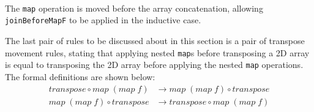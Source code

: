 \documentclass{l4proj}
\begin{document}
\begin{code}
%
\>[2]\AgdaSpace{}%
\AgdaSpace{}%
\AgdaSpace{}%
\AgdaSpace{}%
\AgdaSymbol{(}\AgdaSpace{}%
\AgdaSymbol{)}\AgdaSpace{}%
\<%
\\
\>[2][@{}l@{\AgdaIndent{0}}]%
\>[4]\AgdaSpace{}%
\AgdaSpace{}%
\AgdaSpace{}%
\AgdaOperator{\AgdaFunction{++}}\AgdaSpace{}%
\AgdaSpace{}%
\AgdaSpace{}%
\AgdaSymbol{(}\AgdaSpace{}%
\AgdaSymbol{)}\<%
\\
%
\>[2]\AgdaSpace{}%
\AgdaSpace{}%
\AgdaSymbol{(}\AgdaSpace{}%
\AgdaSpace{}%
\AgdaSpace{}%
\AgdaOperator{\AgdaFunction{++\AgdaUnderscore{}}}\AgdaSymbol{)}\AgdaSpace{}%
\AgdaSymbol{(}\AgdaSpace{}%
\AgdaSpace{}%
\AgdaSymbol{)}\AgdaSpace{}%
\<%
\\
\>[2][@{}l@{\AgdaIndent{0}}]%
\>[4]\<%
\end{code}
The \texttt{map} operation is moved before the array concatenation, allowing \texttt{joinBeforeMapF} to be applied in the inductive case.

The last pair of rules to be discussed about in this section is a pair of transpose movement rules, stating that applying nested \texttt{map}s before transposing a 2D array is equal to transposing the 2D array before applying the nested \texttt{map} operations. The formal definitions are shown below:
\begin{align}
    \label{transposemove:1}
    transpose \circ map\; (map\; f) &\to map\; (map\; f) \circ transpose \\
    \label{transposemove:2}
    map\; (map\; f) \circ transpose &\to transpose \circ map\; (map\; f)
\end{align}
\end{document}
